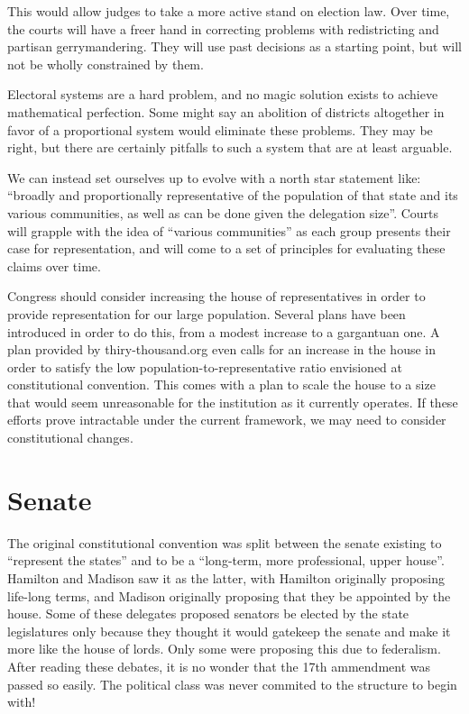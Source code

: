 \documentclass{article}
\begin{document}
This would allow judges to take a more active stand on election law. Over time, the courts will have a freer hand in correcting problems with redistricting and partisan gerrymandering. They will use past decisions as a starting point, but will not be wholly constrained by them.

Electoral systems are a hard problem, and no magic solution exists to achieve mathematical perfection. Some might say an abolition of districts altogether in favor of a proportional system would eliminate these problems. They may be right, but there are certainly pitfalls to such a system that are at least arguable.

We can instead set ourselves up to evolve with a north star statement like: “broadly and proportionally representative of the population of that state and its various communities, as well as can be done given the delegation size”. Courts will grapple with the idea of “various communities” as each group presents their case for representation, and will come to a set of principles for evaluating these claims over time.

Congress should consider increasing the house of representatives in order to provide representation for our large population. Several plans have been introduced in order to do this, from a modest increase to a gargantuan one\cite{Allen}. A plan provided by thiry-thousand.org even calls for an increase in the house in order to satisfy the low population-to-representative ratio envisioned at constitutional convention\cite{30000}. This comes with a plan to scale the house to a size that would seem unreasonable for the institution as it currently operates. If these efforts prove intractable under the current framework, we may need to consider constitutional changes.

\section{Senate}

The original constitutional convention was split between the senate existing to “represent the states” and to be a “long-term, more professional, upper house”. Hamilton and Madison saw it as the latter, with Hamilton originally proposing life-long terms, and Madison originally proposing that they be appointed by the house. Some of these delegates proposed senators be elected by the state legislatures only because they thought it would gatekeep the senate and make it more like the house of lords. Only some were proposing this due to federalism. After reading these debates, it is no wonder that the 17th ammendment was passed so easily. The political class was never commited to the structure to begin with!
\end{document}

